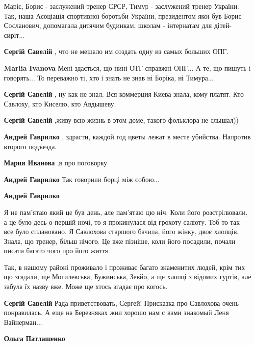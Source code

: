 \begin{itemize}
\begin{itemize}
Маріє, Борис - заслужений тренер СРСР, Тимур - заслужений тренер України. Так,
наша Асоціація спортивної боротьби України, президентом якої був Борис
Сосланович, допомагала дитячим будинкам, школам - інтернатам для дітей-
сиріт...

\begin{itemize} %
\textbf{Сергій Савелій} , что не мешало им создать одну из самых больших ОПГ.

\textbf{Mariia Ivanova} Мені здається, що нині ОТГ справжні ОПГ... А те, що пишуть і говорять... То переважно ті, хто і знать не знав ні Боріка, ні Тимура...

\textbf{Сергій Савелій} , ну как не знал. Вся коммерция Киева знала, кому платят. Кто Савлоху, кто Киселю, кто Авдышеву.
\end{itemize} %

\textbf{Сергій Савелій} ,живу всю жизнь в этом доме, такого фольклора не слышал))

\begin{itemize} %
\textbf{Андрей Гаврилко} , здрасти, каждой год цветы лежат в месте убийства. Напротив второго подъезда.

\textbf{Мария Иванова} ,я про поговорку

\textbf{Андрей Гаврилко} Так говорили борці між собою...

\textbf{Андрей Гаврилко} 

Я не пам'ятаю який це був день, але пам'ятаю цю ніч. Коли його розстрілювали, а це
було десь о першій ночі, то я прокинулася від грохоту салюту. Тоб то так все
було сплановано. Я Савлохова старшого бачила, його жінку, двоє хлопців. Знала, що
тренер, більш нічого. Це вже пізніше, коли його посадили, почали писати багато чого
про його життя.

Так, в нашому районі проживало і проживає багато знаменитих людей, крім тих що
згадали, ще Могилевська, Бужинська, Зевйо, а ще хлопці з відомих гуртів, але забула
їх назву вже. Може ще хтось згадає про когось.
\end{itemize} %

\textbf{Сергій Савелій} Рада приветствовать, Сергей! Присказка про Савлохова очень понравилась.
А еще на Березняках жил хорошо нам с вами знакомый Леня Вайнерман...

\begin{itemize} %
\textbf{Ольга Патлашенко} 


\end{itemize}
\end{itemize}
\end{itemize}
